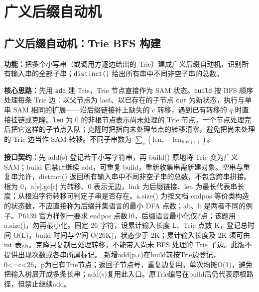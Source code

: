 

\Needspace{660pt}

\chapter{广义后缀自动机}

\section{广义后缀自动机：Trie BFS 构建}\label{compact-GeneralSAM}

\noindent\textbf{功能：}\allowbreak 把多个小写串（或调用方逐边给出的 Trie）建成广义后缀自动机，识别所有输入串的全部子串；\texttt{distinct()} 给出所有串中不同非空子串的总数。

\textbf{核心思路：}\allowbreak 先用 \texttt{add} 建 Trie，Trie 节点直接作为 SAM 状态。\texttt{build} 按 BFS 顺序处理每条 Trie 边：以父节点为 last、以已存在的子节点 \texttt{cur} 为新状态，执行与单串 SAM 相同的扩展——沿后缀链接补上缺失的 $c$ 转移，遇到已有转移的 $q$ 时直接挂链或克隆。\texttt{len} 为 0 的非根节点表示尚未处理的 Trie 节点，一个节点处理完后把它这样的子节点入队；克隆时把指向未处理节点的转移清零，避免把尚未处理的 Trie 边当作 SAM 转移。不同子串数为 $\sum_v(\mathrm{len}_v-\mathrm{len}_{\mathrm{link}(v)})$。



{\sloppy{}\noindent\textbf{接口契约：}先 add(s) 登记若干小写字符串，再 build() 原地将 Trie 变为广义 SAM；build 后禁止继续 add，可重复 build，重新收集串需新建对象。空串与重复串允许，distinct() 返回所有输入串中不同非空子串的总数，不包含跨串拼接。根为 0，a[v].go[c] 为转移、0 表示无边，link 为后缀链接、len 为最长代表串长度；从根沿字符转移可判定子串是否存在。a.size() 为按文档 endpos 等价类构造的状态数，不应直接称为后缀并集语言的最小 DFA 点数；ab、b 是两者不同的例子。P6139 官方样例一要求 endpos 点数10，后缀语言最小化仅7点；该题用 a.size()，勿再最小化。固定 26 字符，设累计输入长度 L、Trie 点数 K，登记总时间 O(L)，build 时间与空间 O(26K)，状态少于 2K；累计输入长度及 2K 须可由 int 表示。克隆只复制已处理转移，不能带入尚未 BFS 处理的 Trie 子边。此版不提供出现次数或各串所属标记。 新增add(p,c)在build前按Trie边登记，0<=c<26，p为已有Trie节点；返回子节点号，重复边复用。单次均摊O(1)，避免把输入树展开成多条长串；add(s)复用此入口。原Trie编号在build后仍代表原根路径，但禁止继续add。\par}

\Needspace{453pt}

